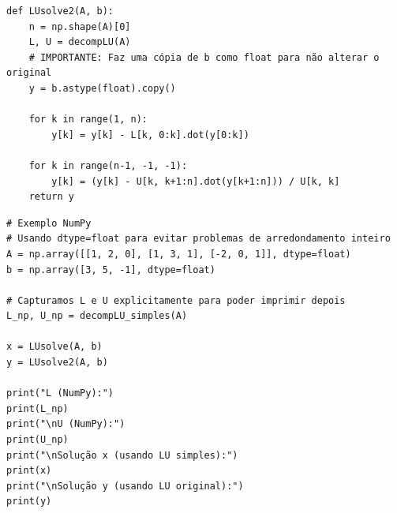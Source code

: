 \documentclass[../numerical_methods.tex]{subfiles}
\begin{document}
\begin{listing}[H]
	\begin{verbatim}
def LUsolve2(A, b):
    n = np.shape(A)[0]
    L, U = decompLU(A)
    # IMPORTANTE: Faz uma cópia de b como float para não alterar o original
    y = b.astype(float).copy()

    for k in range(1, n):
        y[k] = y[k] - L[k, 0:k].dot(y[0:k])

    for k in range(n-1, -1, -1):
        y[k] = (y[k] - U[k, k+1:n].dot(y[k+1:n])) / U[k, k]
    return y
\end{verbatim}
	\begin{verbatim}
# Exemplo NumPy
# Usando dtype=float para evitar problemas de arredondamento inteiro
A = np.array([[1, 2, 0], [1, 3, 1], [-2, 0, 1]], dtype=float)
b = np.array([3, 5, -1], dtype=float)

# Capturamos L e U explicitamente para poder imprimir depois
L_np, U_np = decompLU_simples(A)

x = LUsolve(A, b)
y = LUsolve2(A, b)

print("L (NumPy):")
print(L_np)
print("\nU (NumPy):")
print(U_np)
print("\nSolução x (usando LU simples):")
print(x)
print("\nSolução y (usando LU original):")
print(y)
\end{verbatim}
\end{listing}
\end{document}
